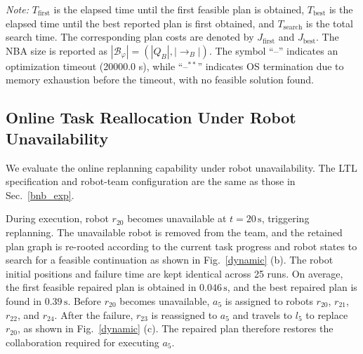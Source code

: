 \documentclass[lettersize,journal]{IEEEtran}
\newcommand{\tablefontsize}{\scriptsize}
\theoremstyle{italiclemma}
\theoremstyle{italiclemma}
\theoremstyle{definition}
\begin{document}
\begin{table}[!t]
\vspace{2pt}
\begin{minipage}{0.94\textwidth}
\tablefontsize
\textit{Note:} $T_{\mathrm{first}}$ is the elapsed time until the first
feasible plan is obtained, $T_{\mathrm{best}}$ is the elapsed time
until the best reported plan is first obtained, and
$T_{\mathrm{search}}$ is the total search time. The corresponding plan
costs are denoted by $J_{\mathrm{first}}$ and $J_{\mathrm{best}}$.
The NBA size is reported as $|\mathcal B_\varphi|=(|Q_B|,|\rightarrow_B|)$.
The symbol ``--'' indicates an optimization timeout (20000.0 s), while
``--$^{**}$'' indicates OS termination due to memory exhaustion before
the timeout, with no feasible solution found.
\end{minipage}
\end{table}

\subsection{Online Task Reallocation Under Robot Unavailability}
We evaluate the online replanning capability  under robot unavailability. The LTL specification and robot-team configuration are the same as those in Sec.~\ref{bnb_exp}.


During execution, robot $r_{20}$ becomes unavailable at
$t=20\,\mathrm{s}$, triggering replanning. The unavailable robot is removed from the team, and the retained plan graph is re-rooted according to the current task progress and robot states to search for a feasible continuation as shown in Fig.~\ref{dynamic} (b). The robot initial positions and failure time are kept identical across 25 runs. On average, the first feasible repaired plan is obtained in $0.046\,\mathrm{s}$, and the best repaired plan is found in $0.39\,\mathrm{s}$. Before $r_{20}$ becomes unavailable, $a_5$ is assigned to robots $r_{20}$, $r_{21}$, $r_{22}$, and $r_{24}$. After the failure, $r_{23}$ is reassigned to $a_5$ and travels to $l_5$ to replace $r_{20}$, as shown in Fig.~\ref{dynamic} (c). The repaired plan therefore restores the collaboration required for executing $a_5$.

\end{document}
